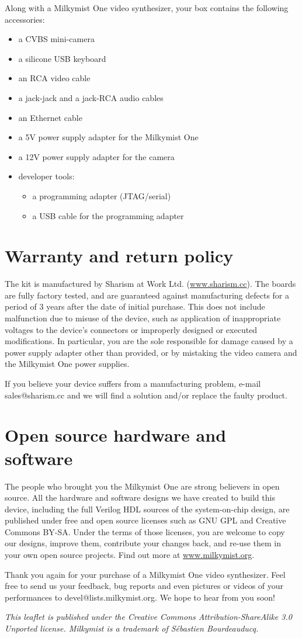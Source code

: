 \documentclass{leaflet}
\begin{document}
Along with a Milkymist One video synthesizer, your box contains the following accessories:
\begin{itemize}
\item a CVBS mini-camera
\item a silicone USB keyboard
\item an RCA video cable
\item a jack-jack and a jack-RCA audio cables
\item an Ethernet cable
\item a 5V power supply adapter for the Milkymist One
\item a 12V power supply adapter for the camera
\item developer tools:
\begin{itemize}
\item a programming adapter (JTAG/serial)
\item a USB cable for the programming adapter
\end{itemize}
\end{itemize}

\section{Warranty and return policy}
The kit is manufactured by Sharism at Work Ltd. (\url{www.sharism.cc}). The boards are fully factory tested, and are guaranteed against manufacturing defects for a period of 3 years after the date of initial purchase. This does not include malfunction due to misuse of the device, such as application of inappropriate voltages to the device's connectors or improperly designed or executed modifications. In particular, you are the sole responsible for damage caused by a power supply adapter other than provided, or by mistaking the video camera and the Milkymist One power supplies.

If you believe your device suffers from a manufacturing problem, e-mail sales@sharism.cc and we will find a solution and/or replace the faulty product.

\section{Open source hardware and software}
The people who brought you the Milkymist One are strong believers in open source. All the hardware and software designs we have created to build this device, including the full Verilog HDL sources of the system-on-chip design, are published under free and open source licenses such as GNU GPL and Creative Commons BY-SA. Under the terms of those licenses, you are welcome to copy our designs, improve them, contribute your changes back, and re-use them in your own open source projects. Find out more at \url{www.milkymist.org}.

Thank you again for your purchase of a Milkymist One video synthesizer. Feel free to send us your feedback, bug reports and even pictures or videos of your performances to devel@lists.milkymist.org. We hope to hear from you soon!

\textit{This leaflet is published under the Creative Commons Attribution-ShareAlike 3.0 Unported license. Milkymist is a trademark of S\'ebastien Bourdeauducq.}
\end{document}
